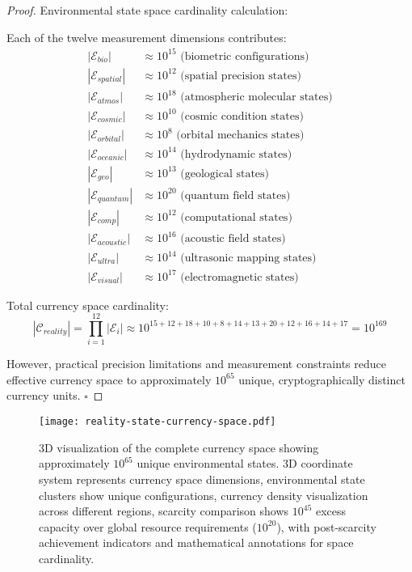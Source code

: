 \documentclass[12pt,a4paper]{article}
\begin{document}
\begin{proof}
Environmental state space cardinality calculation:

Each of the twelve measurement dimensions contributes:
\begin{align}
|\mathcal{E}_{bio}| &\approx 10^{15} \text{ (biometric configurations)} \\
|\mathcal{E}_{spatial}| &\approx 10^{12} \text{ (spatial precision states)} \\
|\mathcal{E}_{atmos}| &\approx 10^{18} \text{ (atmospheric molecular states)} \\
|\mathcal{E}_{cosmic}| &\approx 10^{10} \text{ (cosmic condition states)} \\
|\mathcal{E}_{orbital}| &\approx 10^{8} \text{ (orbital mechanics states)} \\
|\mathcal{E}_{oceanic}| &\approx 10^{14} \text{ (hydrodynamic states)} \\
|\mathcal{E}_{geo}| &\approx 10^{13} \text{ (geological states)} \\
|\mathcal{E}_{quantum}| &\approx 10^{20} \text{ (quantum field states)} \\
|\mathcal{E}_{comp}| &\approx 10^{12} \text{ (computational states)} \\
|\mathcal{E}_{acoustic}| &\approx 10^{16} \text{ (acoustic field states)} \\
|\mathcal{E}_{ultra}| &\approx 10^{14} \text{ (ultrasonic mapping states)} \\
|\mathcal{E}_{visual}| &\approx 10^{17} \text{ (electromagnetic states)}
\end{align}

Total currency space cardinality:
\begin{equation}
|\mathcal{C}_{reality}| = \prod_{i=1}^{12} |\mathcal{E}_i| \approx 10^{15+12+18+10+8+14+13+20+12+16+14+17} = 10^{169}
\end{equation}

However, practical precision limitations and measurement constraints reduce effective currency space to approximately $10^{65}$ unique, cryptographically distinct currency units. $\square$
\end{proof}

\begin{figure}[H]
\centering
\texttt{[image: reality-state-currency-space.pdf]}
\caption{3D visualization of the complete currency space showing approximately $10^{65}$ unique environmental states. 3D coordinate system represents currency space dimensions, environmental state clusters show unique configurations, currency density visualization across different regions, scarcity comparison shows $10^{45}$ excess capacity over global resource requirements ($10^{20}$), with post-scarcity achievement indicators and mathematical annotations for space cardinality.}
\label{fig:currency_space}
\end{figure}
\end{document}
